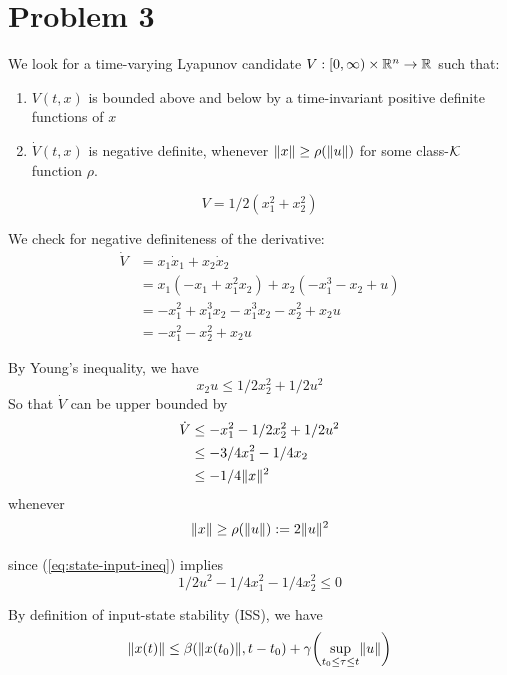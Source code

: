 \documentclass{homework}
\begin{document}
\section{Problem 3}
\begin{letterenum}
\item We look for a time-varying Lyapunov candidate $V: [0, \infty) \times \mathbb{R}^n \to \mathbb{R}$ such that:
\begin{enumerate}
    \item $V(t, x)$ is bounded above and below by a time-invariant positive definite functions of $x$
    \item $\dot{V}(t, x)$ is negative definite, whenever $\lVert x \rVert \geq \rho(\lVert u \rVert)$
        for some class-$\mathcal{K}$ function $\rho$.
\end{enumerate}

\begin{equation*}
    V = 1/2 (x_1^2 + x_2^2)
\end{equation*}

We check for negative definiteness of the derivative:
\begin{align*}
    \dot{V} &= x_1 \dot{x}_1 + x_2 \dot{x}_2 \\
        &= x_1 ( -x_1 + x_1^2 x_2) + x_2 (-x_1^3 - x_2 + u) \\
        &= -x_1^2 + x_1^3 x_2 - x_1^3 x_2 - x_2^2 + x_2 u \\
        &= -x_1^2 - x_2^2 + x_2 u
\end{align*}

By Young's inequality, we have
\begin{equation*}
    x_2 u \leq 1/2 x_2^2 + 1/2 u^2
\end{equation*}
So that $\dot{V}$ can be upper bounded by
\begin{align*}
    \dot{V} &\leq -x_1^2 - 1/2 x_2^2 + 1/2 u^2 \\
        &\leq -3/4 x_1^2 - 1/4 x_2 \\
        &\leq -1/4 \lVert x \rVert^2
\end{align*}
whenever
\begin{equation}
    \lVert x \rVert \geq \rho(\lVert u \rVert) := 2 \lVert u \rVert^2
    \label{eq:state-input-ineq}
\end{equation}

since (\ref{eq:state-input-ineq}) implies
\begin{equation*}
    1/2 u^2 - 1/4 x_1^2 - 1/4x_2^2 \leq 0
\end{equation*}

\item By definition of input-state stability (ISS), we have
\begin{equation*}
    \lVert x(t) \rVert \leq \beta(\lVert x(t_0) \rVert, t - t_0) +
        \gamma \biggl( \sup_{t_0 \leq \tau \leq t} \lVert u \rVert\biggr)
\end{equation*}


\end{letterenum}
\end{document}
